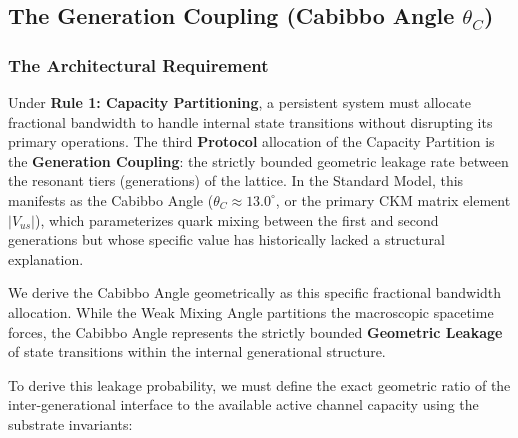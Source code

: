 \subsection{The Generation Coupling (Cabibbo Angle \texorpdfstring{$\theta_C$}{thetaC})}
\label{subsec:generation_coupling}


\subsubsection{The Architectural Requirement}
Under \textbf{Rule 1: Capacity Partitioning}, a persistent system must allocate fractional bandwidth to handle internal state transitions without disrupting its primary operations. The third \textbf{Protocol} allocation of the Capacity Partition is the \textbf{Generation Coupling}: the strictly bounded geometric leakage rate between the resonant tiers (generations) of the lattice. In the Standard Model, this manifests as the Cabibbo Angle ($\theta_C \approx 13.0^\circ$, or the primary CKM matrix element $|V_{us}|$), which parameterizes quark mixing between the first and second generations but whose specific value has historically lacked a structural explanation.

We derive the Cabibbo Angle geometrically as this specific fractional bandwidth allocation. While the Weak Mixing Angle partitions the macroscopic spacetime forces, the Cabibbo Angle represents the strictly bounded \textbf{Geometric Leakage} of state transitions within the internal generational structure.

To derive this leakage probability, we must define the exact geometric ratio of the inter-generational interface to the available active channel capacity using the substrate invariants:

